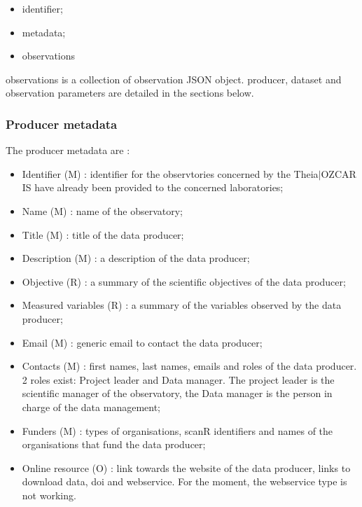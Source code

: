 \begin{itemize}
\item 	 identifier;
\item 	 metadata;
\item 	 observations
\end{itemize}

observations is a collection of observation JSON object. producer, dataset and observation parameters are detailed in the sections below. 

\subsubsection{Producer metadata}

The producer metadata are : 

\begin{itemize}
\item 	 Identifier (M) : identifier for the observtories concerned by the Theia$\vert$OZCAR IS have already been provided to the concerned laboratories;
\item 	 Name (M) : name of the observatory;
\item 	 Title (M) : title of the data producer;
\item 	 Description (M) : a description of the data producer;
\item 	 Objective (R) : a summary of the scientific objectives of the data producer;
\item 	 Measured variables (R) : a summary of the variables observed by the data producer;
\item 	 Email (M) : generic email to contact the data producer;
\item 	 Contacts (M) : first names, last names, emails and roles of the data producer. 2 roles exist: Project leader and Data manager. The project leader is the scientific manager of the observatory, the Data manager is the person in charge of the data management;
\item 	 Funders (M) : types of organisations, scanR identifiers and names of the organisations that fund the data producer;
\item 	 Online resource (O) : link towards the website of the data producer, links to download data, doi and webservice. For the moment, the webservice type is not working.
\end{itemize}


